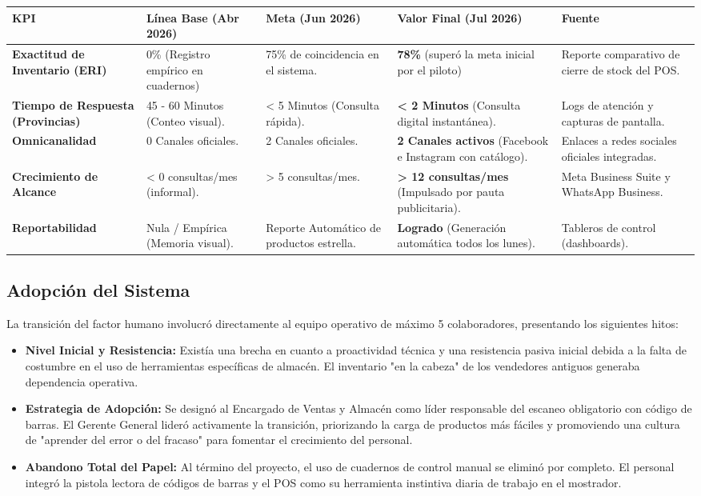 \begin{table}[H]
\centering
\renewcommand{\arraystretch}{1.3}
\setlength{\tabcolsep}{4pt}
\scriptsize
\begin{tabular}{|p{2.6cm}|p{2.8cm}|p{2.8cm}|p{3.2cm}|p{3.2cm}|}
\hline
\rowcolor{gray!20}
\textbf{KPI} & \textbf{Línea Base (Abr 2026)} & \textbf{Meta (Jun 2026)} & \textbf{Valor Final (Jul 2026)} & \textbf{Fuente} \\ \hline
\textbf{Exactitud de Inventario (ERI)} & 0\% (Registro empírico en cuadernos) & 75\% de coincidencia en el sistema. & \textbf{78\%} (superó la meta inicial por el piloto) & Reporte comparativo de cierre de stock del POS. \\ \hline
\textbf{Tiempo de Respuesta (Provincias)} & 45 - 60 Minutos (Conteo visual). & < 5 Minutos (Consulta rápida). & \textbf{< 2 Minutos} (Consulta digital instantánea). & Logs de atención y capturas de pantalla. \\ \hline
\textbf{Omnicanalidad} & 0 Canales oficiales. & 2 Canales oficiales. & \textbf{2 Canales activos} (Facebook e Instagram con catálogo). & Enlaces a redes sociales oficiales integradas. \\ \hline
\textbf{Crecimiento de Alcance} & < 0 consultas/mes (informal). & > 5 consultas/mes. & \textbf{> 12 consultas/mes} (Impulsado por pauta publicitaria). & Meta Business Suite y WhatsApp Business. \\ \hline
\textbf{Reportabilidad} & Nula / Empírica (Memoria visual). & Reporte Automático de productos estrella. & \textbf{Logrado} (Generación automática todos los lunes). & Tableros de control (dashboards). \\ \hline
\end{tabular}
\end{table}

\subsection{Adopción del Sistema}
La transición del factor humano involucró directamente al equipo operativo de máximo 5 colaboradores, presentando los siguientes hitos:
\begin{itemize}
    \item \textbf{Nivel Inicial y Resistencia:} Existía una brecha en cuanto a proactividad técnica y una resistencia pasiva inicial debida a la falta de costumbre en el uso de herramientas específicas de almacén. El inventario "en la cabeza" de los vendedores antiguos generaba dependencia operativa.
    \item \textbf{Estrategia de Adopción:} Se designó al Encargado de Ventas y Almacén como líder responsable del escaneo obligatorio con código de barras. El Gerente General lideró activamente la transición, priorizando la carga de productos más fáciles y promoviendo una cultura de "aprender del error o del fracaso" para fomentar el crecimiento del personal.
    \item \textbf{Abandono Total del Papel:} Al término del proyecto, el uso de cuadernos de control manual se eliminó por completo. El personal integró la pistola lectora de códigos de barras y el POS como su herramienta instintiva diaria de trabajo en el mostrador.
\end{itemize}

